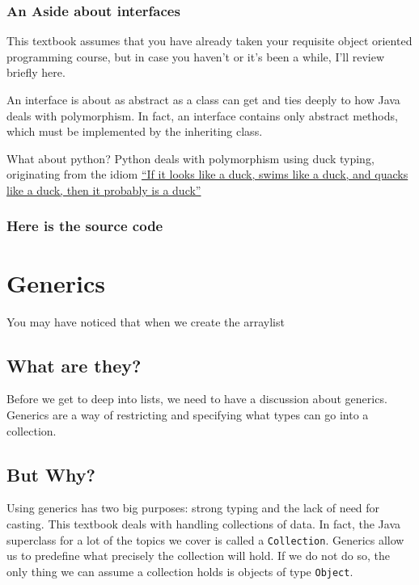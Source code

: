 \subsubsection{An Aside about interfaces}
This textbook assumes that you have already taken your requisite object oriented programming course, but in case you haven't or it's been a while, I'll review briefly here.


An interface is about as abstract as a class can get and ties deeply to how Java deals with polymorphism.  In fact, an interface contains only abstract methods, which must be implemented by the inheriting class.


What about python?  Python deals with polymorphism using duck typing, originating from the idiom  \href{https://en.wikipedia.org/wiki/Duck\_test}{``If it looks like a duck, swims like a duck, and quacks like a duck, then it probably is a duck''}
\subsubsection*{Here is the source code}



\section{Generics}

You may have noticed that when we create the arraylist

\subsection{What are they?}


Before we get to deep into lists, we need to have a discussion about generics. Generics are a way of restricting and specifying what types can go into a collection.

\subsection{But Why?}


Using generics has two big purposes: strong typing and the lack of need for casting.  This textbook deals with handling collections of data.   In fact, the Java superclass for a lot of the topics we cover is called a \texttt{Collection}.  Generics allow us to predefine what precisely the collection will hold.  If we do not do so, the only thing we can assume a collection holds is objects of type \texttt{Object}.

